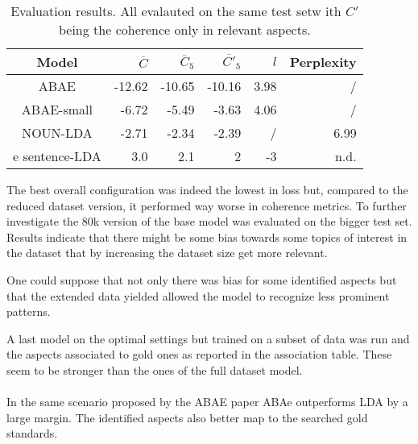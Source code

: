 \begin{center}
    \begin{table}
        \begin{tabular}{c r r r r r}
            \hline
            Model        & $\overline{C}$ & $\overline{C}_5$ & $\overline{C'}_5$ & $l$  & Perplexity\\ [0.5ex]
            \hline
            ABAE         & -12.62         & -10.65           & -10.16            & 3.98 & /          \\
            \hline
            ABAE-small   & -6.72          & -5.49            & -3.63             & 4.06 & /          \\
            \hline %
            NOUN-LDA     & -2.71          & -2.34            & -2.39             & /    & 6.99       \\
            \hline e %
            sentence-LDA & 3.0            & 2.1              & 2                 & -3   & n.d.       \\
            \hline
        \end{tabular}
        \caption{Evaluation results. All evalauted on the same test setw ith $C'$ being the coherence only in relevant aspects.
        }
        \label{performance-review}

    \end{table}

\end{center}


The best overall configuration was indeed the lowest in loss but, compared to the reduced
dataset version, it performed way worse in coherence metrics.
To further investigate the 80k version of the base model was evaluated on the bigger test set.
Results indicate that there might be some bias towards some topics of interest in the dataset
that by increasing the dataset size get more relevant.

One could suppose that not only there was bias for some identified aspects but that the extended
data yielded allowed the model to recognize less prominent patterns.

A last model on the optimal settings but trained on a subset of data was run and the aspects
associated to gold ones as reported in the association table.
These seem to be stronger than the ones of the full dataset model.

\paragraph{}
In the same scenario proposed by the ABAE paper ABAe outperforms LDA by a large margin.
The identified aspects also better map to the searched gold standards.

